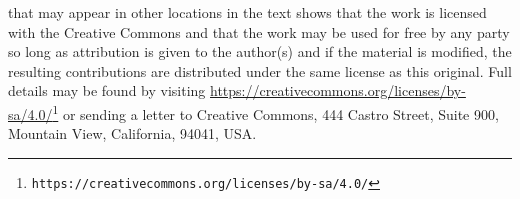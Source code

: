 \documentclass[oneside,10pt,]{book}
\numberwithin{equation}{section}
\begin{document}
 that may appear in other locations in the text shows that the work is licensed with the Creative Commons and that the work may be used for free by any party so long as attribution is given to the author(s) and if the material is modified, the resulting contributions are distributed under the same license as this original. Full details may be found by visiting \href{https://creativecommons.org/licenses/by-sa/4.0/}{https:\slash{}\slash{}creativecommons.org\slash{}licenses\slash{}by-sa\slash{}4.0\slash{}}\footnote{\nolinkurl{https://creativecommons.org/licenses/by-sa/4.0/}\label{g:fn:idp105544811453584}}  or sending a letter to Creative Commons, 444 Castro Street, Suite 900, Mountain View, California, 94041, USA.\par\medskip
{}
\null\clearpage
%
%
\typeout{************************************************}
\typeout{************************************************}
%
\end{document}
